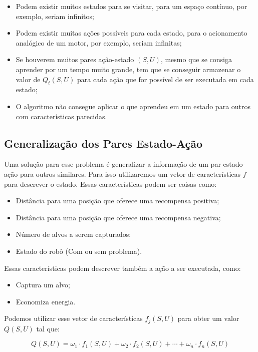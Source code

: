 \begin{itemize}
	\item Podem existir muitos estados para se visitar, para um espaço contínuo, por exemplo, seriam infinitos;
	\item Podem existir muitas ações possíveis para cada estado, para o acionamento analógico de um motor, por exemplo, seriam infinitas;
	\item Se houverem muitos pares ação-estado $ \left( S, U \right) $, mesmo que se consiga aprender por um tempo muito grande, tem que se conseguir armazenar o valor de $ Q_t \left( S, U \right) $ para cada ação que for possível de ser executada em cada estado;
	\item O algoritmo não consegue aplicar o que aprendeu em um estado para outros com características parecidas.
\end{itemize}

\subsection{Generalização dos Pares Estado-Ação}

Uma solução para esse problema é generalizar a informação de um par estado-ação para outros similares. Para isso utilizaremos um vetor de características $ f $ para descrever o estado. Essas características podem ser coisas como:

\begin{itemize}
	\item Distância para uma posição que oferece uma recompensa positiva;
	\item Distância para uma posição que oferece uma recompensa negativa;
	\item Número de alvos a serem capturados;
	\item Estado do robô (Com ou sem problema).
\end{itemize}

Essas características podem descrever também a ação a ser executada, como:

\begin{itemize}
	\item Captura um alvo;
	\item Economiza energia.
\end{itemize}

Podemos utilizar esse vetor de características $ f_j \left( S, U \right) $ para obter um valor $ Q \left( S, U \right) $ tal que:

\begin{equation}
	Q \left( S, U \right) = \omega_1 \cdot f_1 \left( S, U \right) + \omega_2 \cdot f_2 \left( S, U \right) + \cdots + \omega_n \cdot f_n \left( S, U \right)
\end{equation}

